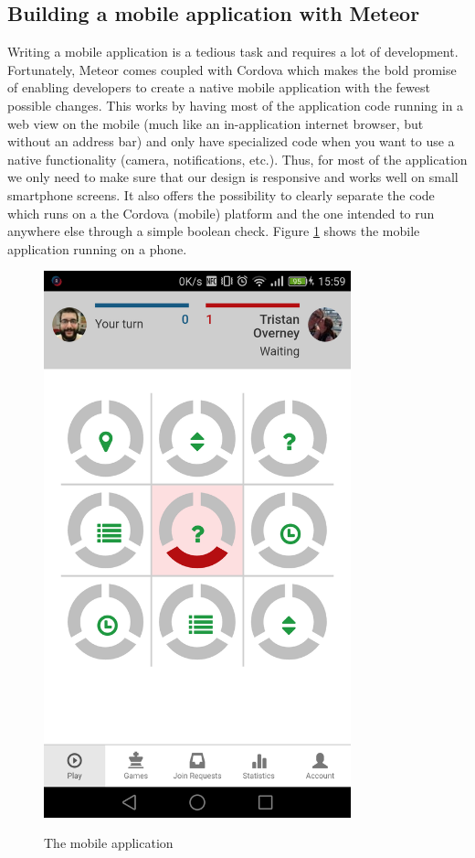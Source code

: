 \subsection{Building a mobile application with Meteor}
Writing a mobile application is a tedious task and requires a lot of development. Fortunately, Meteor comes coupled with Cordova\cite{cordova} which makes the bold promise of enabling developers to create a native mobile application with the fewest possible changes. This works by having most of the application code running in a web view on the mobile (much like an in-application internet browser, but without an address bar) and only have specialized code when you want to use a native functionality (camera, notifications, etc.). Thus, for most of the application we only need to make sure that our design is responsive and works well on small smartphone screens. It also offers the possibility to clearly separate the code which runs on a the Cordova (mobile) platform and the one intended to run anywhere else through a simple boolean check. Figure \ref{fig:mobscreen} shows the mobile application running on a phone.

\begin{figure}
\centering
{\includegraphics[width=3.5in]{images/mobile_screenshot.png}}
\caption{The mobile application}
\label{fig:mobscreen}
\end{figure}

